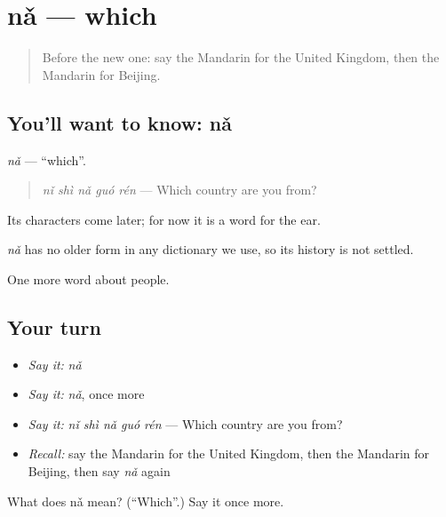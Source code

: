 \section[nǎ]{nǎ — which}

\label{lesson:ZH-C36-na}



\begin{quote}
Before the new one: say the Mandarin for the United Kingdom, then the Mandarin for Beijing.
\end{quote}

\subsection*{You'll want to know: nǎ}
\emph{nǎ} — \textquotedblleft{}which\textquotedblright{}.

\begin{quote}
\emph{nǐ shì nǎ guó rén} — Which country are you from?
\end{quote}

Its characters come later; for now it is a word for the ear.

\begin{cousinweb}
\emph{nǎ} has no older form in any dictionary we use, so its history is not settled.
\end{cousinweb}

\begin{grammarlens}[title={What you've built}]
One more word about people.
\end{grammarlens}

\subsection*{Your turn}
\begin{itemize}
\raggedright
  \item \emph{Say it:} \emph{nǎ}
  \item \emph{Say it:} \emph{nǎ}, once more
  \item \emph{Say it:} \emph{nǐ shì nǎ guó rén} — Which country are you from?
  \item \emph{Recall:} say the Mandarin for the United Kingdom, then the Mandarin for Beijing, then say \emph{nǎ} again
\end{itemize}

\begin{tcolorbox}[breakable,colback=teal!4,colframe=teal!35!black,title={Before you move on}]
What does nǎ mean? (\textquotedblleft{}Which\textquotedblright{}.) Say it once more.
\end{tcolorbox}
